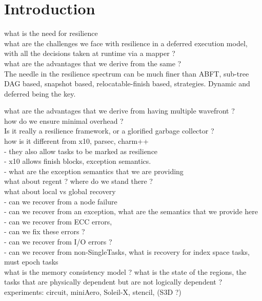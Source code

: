
\section{Introduction}

what is the need for resilience\\

what are the challenges we face with resilience in a deferred execution model, with all the decisions taken at runtime via a mapper ? \\

what are the advantages that we derive from the same ?\\
The needle in the resilience spectrum can be much finer than ABFT, sub-tree DAG based, snapshot based, relocatable-finish based, strategies. Dynamic and deferred being the key.

what are the advantages that we derive from having multiple wavefront ?\\
how do we ensure minimal overhead ?\\

Is it really a resilience framework, or a glorified garbage collector ?\\


how is it different from x10, parsec, charm++\\
	- they also allow tasks to be marked as resilience\\
	- x10 allows finish blocks, exception semantics.\\
	- what are the exception semantics that we are providing\\


what about regent ? where do we stand there ?\\

what about local vs global recovery\\
	- can we recover from a node failure\\
	- can we recover from an exception, what are the semantics that we provide here\\
	- can we recover from ECC errors, \\
	- can we fix these errors ?\\
	- can we recover from I/O errors ?\\ 
	- can we recover from non-SingleTasks, what is recovery for index space tasks, must epoch tasks\\

what is the memory consistency model ? what is the state of the regions, the tasks that are physically dependent but are not logically dependent ?\\
	

experiments: circuit, miniAero, Soleil-X, stencil, (S3D ?)\\


